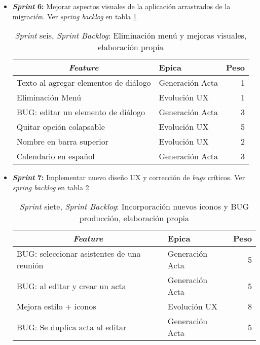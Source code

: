 \begin{itemize}
	\item \textbf{\textit{Sprint} 6:} Mejorar aspectos visuales de la aplicación arrastrados de la migración. Ver \textit{spring backlog} en tabla \ref{tab:backlog6}

\begin{table}[!h]
\centering
\caption{\textit{Sprint} seis, \textit{Sprint Backlog}: Eliminación menú y mejoras visuales, elaboración propia}
\label{tab:backlog6}
\begin{tabular}{|l|l|r|}
\hline
\multicolumn{1}{|c|}{\textit{\textbf{Feature}}} & \textbf{Epica} & \textbf{Peso} \\ \hline
Texto al agregar elementos de diálogo & Generación Acta & 1 \\ \hline
Eliminación Menú & Evolución UX & 1 \\ \hline
BUG: editar un elemento de diálogo & Generación Acta & 3 \\ \hline
Quitar opción colapsable & Evolución UX & 5 \\ \hline
Nombre en barra superior & Evolución UX & 2 \\ \hline
Calendario en español & Generación Acta & 3 \\ \hline
\end{tabular}
\end{table}


	\item \textbf{\textit{Sprint} 7:} Implementar nuevo diseño UX y corrección de \textit{bugs} críticos. Ver \textit{spring backlog} en tabla \ref{tab:backlog7}

\begin{table}[!h]
\centering
\caption{\textit{Sprint} siete, \textit{Sprint Backlog}: Incorporación nuevos iconos y BUG producción, elaboración propia}
\label{tab:backlog7}
\begin{tabular}{|l|l|r|}
\hline
\multicolumn{1}{|c|}{\textit{\textbf{Feature}}} & \textbf{Epica} & \textbf{Peso} \\ \hline
BUG: seleccionar asistentes de una reunión & Generación Acta & 5 \\ \hline
BUG: al editar y crear un acta & Generación Acta & 5 \\ \hline
Mejora estilo + iconos & Evolución UX & 8 \\ \hline
BUG: Se duplica acta al editar & Generación Acta & 5 \\ \hline
\end{tabular}
\end{table}



\end{itemize}
